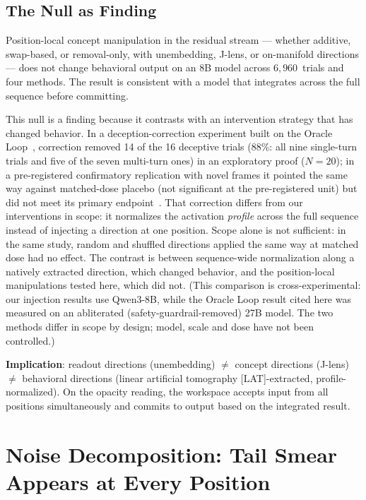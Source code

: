 \documentclass[11pt,a4paper]{article}
\begin{document}
\subsection{The Null as Finding}

Position-local concept manipulation in the residual stream --- whether additive,
swap-based, or removal-only, with unembedding, J-lens, or on-manifold
directions --- does not change behavioral output on an 8B model across
$6{,}960$~trials and four methods. The result is consistent with a model
that integrates across the full sequence before committing.

This null is a finding because it contrasts with an intervention
strategy that has changed behavior. In a deception-correction experiment built on the Oracle Loop~\citep{lyra2026oracle}, correction
removed 14 of the 16 deceptive trials (88\%: all nine single-turn trials and five of the seven multi-turn ones) in an exploratory proof ($N=20$); in a pre-registered confirmatory replication with novel frames it pointed the same way against matched-dose placebo (not significant at the pre-registered unit) but did not meet its primary endpoint~\citep{cc2026targeted}.
That correction differs from our interventions in scope: it normalizes the activation \emph{profile} across the full sequence instead of injecting a direction at one position.
Scope alone is not sufficient: in the same study, random and shuffled directions applied the same way at matched dose had no effect.
The contrast is between sequence-wide normalization along a natively extracted direction, which changed behavior, and the position-local manipulations tested here, which did not.
(This comparison is cross-experimental: our injection results use Qwen3-8B, while the Oracle Loop result cited here was measured on an abliterated (safety-guardrail-removed) 27B model. The two methods differ in scope by design; model, scale and dose have not been controlled.)

\textbf{Implication}: readout directions (unembedding) $\neq$ concept
directions (J-lens) $\neq$ behavioral directions (linear artificial
tomography [LAT]-extracted,
profile-normalized). On the opacity reading, the workspace accepts input
from all positions simultaneously and commits to output based on the
integrated result.

\section{Noise Decomposition: Tail Smear Appears at Every Position}
\label{sec:noise}
\end{document}
